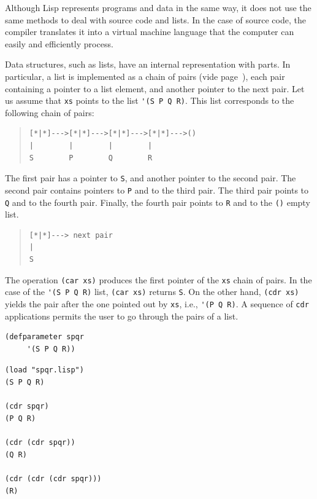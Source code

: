 \documentclass[a4paper,12pt]{book}
\newenvironment{fmpage}[1]
           {\begin{lrbox}{\fmbox}\begin{minipage}{#1}}
           {\end{minipage}\end{lrbox}\fbox{\usebox{\fmbox}}}
\begin{document}
Although Lisp represents programs and
data in the same way, it does not use
the same methods to deal with source
code and lists. In the case of source
code, the compiler translates it into
a virtual machine language that the
computer can easily and efficiently
process.

Data structures, such as lists, have
an internal representation with parts. 
In particular, a list is implemented
as a chain of pairs 
(vide page~\pageref{page:cartesian-pair}),
each pair containing
a pointer to a list element,
and another pointer to the next pair. 
Let us assume that
\verb|xs| points to the list
\verb|'(S P Q R)|.
This list corresponds to the following
chain of pairs:
\begin{quote}
\begin{verbatim}
[*|*]--->[*|*]--->[*|*]--->[*|*]--->()
|        |        |        |        
S        P        Q        R       
\end{verbatim}
\end{quote}
The first pair has a pointer to \verb|S|,
and another pointer to the second pair.
The second pair contains pointers to 
\verb|P| and to the third pair. 
The third pair points to \verb|Q| and
to the fourth pair. Finally, the fourth
pair points to \verb|R| and to 
the \verb|()| empty list.

\begin{quote}
\begin{verbatim}
[*|*]---> next pair
|        
S      
\end{verbatim}
\end{quote}
The operation \verb|(car xs)| produces
the first pointer of the \verb|xs| 
chain of pairs. In the case of
the \verb|'(S P Q R)| list, \verb|(car xs)|
returns \verb|S|. On the other hand,
\verb|(cdr xs)| yields the pair
after the one pointed out by \verb|xs|,
i.e., \verb|'(P Q R)|. A sequence
of \verb|cdr| applications permits the user to
go through the pairs of a list. \\

\begin{fmpage}{0.8\linewidth}
\begin{verbatim}
(defparameter spqr
     '(S P Q R))
\end{verbatim}
\end{fmpage}

\begin{fmpage}{0.8\linewidth}
\verb|(load "spqr.lisp")|\\
\verb|(S P Q R)|\\
\verb||\\
\verb|(cdr spqr)|\\
\verb|(P Q R)|\\
\verb||\\
\verb|(cdr (cdr spqr))|\\
\verb|(Q R)|\\
\verb||\\
\verb|(cdr (cdr (cdr spqr)))|\\
\verb|(R)|
\end{fmpage}
\end{document}
